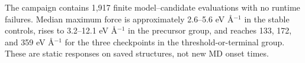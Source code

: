 The campaign contains 1,917 finite model--candidate evaluations with no runtime failures. Median maximum force is approximately 2.6--5.6 eV Å$^{-1}$ in the stable controls, rises to 3.2--12.1 eV Å$^{-1}$ in the precursor group, and reaches 133, 172, and 359 eV Å$^{-1}$ for the three checkpoints in the threshold-or-terminal group. These are static responses on saved structures, not new MD onset times.
